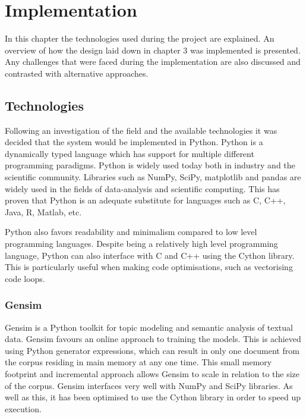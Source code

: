 \chapter{Implementation}

In this chapter the technologies used during the project are explained. An overview of how the design laid down in chapter 3 was implemented is presented.
Any challenges that were faced during the implementation are also discussed and contrasted with alternative approaches.

\section{Technologies}
Following an investigation of the field and the available technologies it was decided that the system would be implemented in Python.
Python is a dynamically typed language which has support for multiple different programming paradigms.
Python is widely used today both in industry and the scientific community.
Libraries such as NumPy, SciPy, matplotlib and pandas are widely used in the fields of data-analysis and scientific computing.
This has proven that Python is an adequate substitute for languages such as C, C++, Java, R, Matlab, etc\cite{PythonR}.

Python also favors readability and minimalism compared to low level programming languages.
Despite being a relatively high level programming language, Python can also interface with C and C++ using the Cython library.
This is particularly useful when making code optimisations, such as vectorising code loops.

\subsection{Gensim}
Gensim is a Python toolkit for topic modeling and semantic analysis of textual data.
Gensim favours an online approach to training the models.
This is achieved using Python generator expressions, which can result in only one document from the corpus residing in main memory at any one time.
This small memory footprint and incremental approach allows Gensim to scale in relation to the size of the corpus.
Gensim interfaces very well with NumPy and SciPy libraries.
As well as this, it has been optimised to use the Cython library in order to speed up execution.


